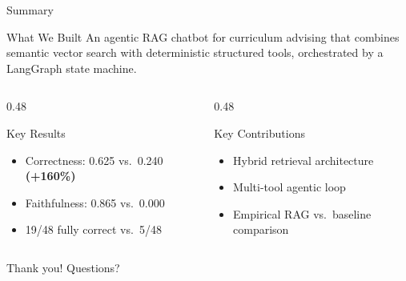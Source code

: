 \documentclass[aspectratio=169,10pt]{beamer}
\begin{document}
\begin{frame}{Summary}

\begin{block}{What We Built}
An agentic RAG chatbot for curriculum advising that combines semantic vector search with deterministic structured tools, orchestrated by a LangGraph state machine.
\end{block}

\vspace{0.3em}

\begin{columns}[T]
\begin{column}{0.48\textwidth}
\begin{exampleblock}{Key Results}
\begin{itemize}
    \item Correctness: 0.625 vs.\ 0.240 \textbf{(+160\%)}
    \item Faithfulness: 0.865 vs.\ 0.000
    \item 19/48 fully correct vs.\ 5/48
\end{itemize}
\end{exampleblock}
\end{column}
\begin{column}{0.48\textwidth}
\begin{exampleblock}{Key Contributions}
\begin{itemize}
    \item Hybrid retrieval architecture
    \item Multi-tool agentic loop
    \item Empirical RAG vs.\ baseline comparison
\end{itemize}
\end{exampleblock}
\end{column}
\end{columns}

\vspace{0.5em}
\begin{center}
\Large Thank you! Questions?
\end{center}

\end{frame}
\end{document}
